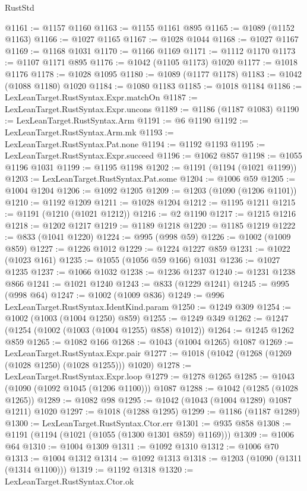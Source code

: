 \begin{lexlean}{RustStd}
\begin{coremodule}
{\begin{coremodule}
{{{{{{{{{{{{{{{{{{{{{{{{{{@1161 := @1157 @1160
@1163 := @1155 @1161 @895
@1165 := @1089 (@1152 @1163)
@1166 := @1027 @1165
@1167 := @1028 @1044
@1168 := @1027 @1167
@1169 := @1168 @1031
@1170 := @1166 @1169
@1171 := @1112 @1170
@1173 := @1107 @1171 @895
@1176 := @1042 (@1105 @1173) @1020
@1177 := @1018 @1176
@1178 := @1028 @1095
@1180 := @1089 (@1177 @1178)
@1183 := @1042 (@1088 @1180) @1020
@1184 := @1080 @1183
@1185 := @1018 @1184
@1186 := LexLeanTarget.RustSyntax.Expr.matchOn
@1187 := LexLeanTarget.RustSyntax.Expr.uncons
@1189 := @1186 (@1187 @1083)
@1190 := LexLeanTarget.RustSyntax.Arm
@1191 := @6 @1190
@1192 := LexLeanTarget.RustSyntax.Arm.mk
@1193 := LexLeanTarget.RustSyntax.Pat.none
@1194 := @1192 @1193
@1195 := LexLeanTarget.RustSyntax.Expr.succeed
@1196 := @1062 @857
@1198 := @1055 @1196 @1031
@1199 := @1195 @1198
@1202 := @1191 (@1194 (@1021 @1199))
@1203 := LexLeanTarget.RustSyntax.Pat.some
@1204 := @1006 @59
@1205 := @1004 @1204
@1206 := @1092 @1205
@1209 := @1203 (@1090 (@1206 @1101))
@1210 := @1192 @1209
@1211 := @1028 @1204
@1212 := @1195 @1211
@1215 := @1191 (@1210 (@1021 @1212))
@1216 := @2 @1190
@1217 := @1215 @1216
@1218 := @1202 @1217
@1219 := @1189 @1218
@1220 := @1185 @1219
@1222 := @833 (@1041 @1220)
@1224 := @995 (@998 @59)
@1226 := @1002 (@1009 @859)
@1227 := @1226 @1012
@1229 := @1224 @1227 @859
@1231 := @1022 (@1023 @161)
@1235 := @1055 (@1056 @59 @166) @1031
@1236 := @1027 @1235
@1237 := @1066 @1032
@1238 := @1236 @1237
@1240 := @1231 @1238 @866
@1241 := @1021 @1240
@1243 := @833 (@1229 @1241)
@1245 := @995 (@998 @64)
@1247 := @1002 (@1009 @836)
@1249 := @996 LexLeanTarget.RustSyntax.IdentKind.param
@1250 := @1249 @309
@1254 := @1002 (@1003 (@1004 @1250) @859)
@1255 := @1249 @349
@1262 := @1247 (@1254 (@1002 (@1003 (@1004 @1255) @858) @1012))
@1264 := @1245 @1262 @859
@1265 := @1082 @166
@1268 := @1043 (@1004 @1265) @1087
@1269 := LexLeanTarget.RustSyntax.Expr.pair
@1277 := @1018 (@1042 (@1268 (@1269 (@1028 @1250) (@1028 @1255))) @1020)
@1278 := LexLeanTarget.RustSyntax.Expr.loop
@1279 := @1278 @1265
@1285 := @1043 (@1090 (@1092 @1045 (@1206 @1100))) @1087
@1288 := @1042 (@1285 (@1028 @1265))
@1289 := @1082 @98
@1295 := @1042 (@1043 (@1004 @1289) @1087 @1211) @1020
@1297 := @1018 (@1288 @1295)
@1299 := @1186 (@1187 @1289)
@1300 := LexLeanTarget.RustSyntax.Ctor.err
@1301 := @935 @858
@1308 := @1191 (@1194 (@1021 (@1055 (@1300 @1301 @859) @1169)))
@1309 := @1006 @64
@1310 := @1004 @1309
@1311 := @1092 @1310
@1312 := @1006 @70
@1313 := @1004 @1312
@1314 := @1092 @1313
@1318 := @1203 (@1090 (@1311 (@1314 @1100)))
@1319 := @1192 @1318
@1320 := LexLeanTarget.RustSyntax.Ctor.ok
}}}}}}}}}}}}}}}}}}}}}}}}}}
\end{coremodule}}
\end{coremodule}
\end{lexlean}
